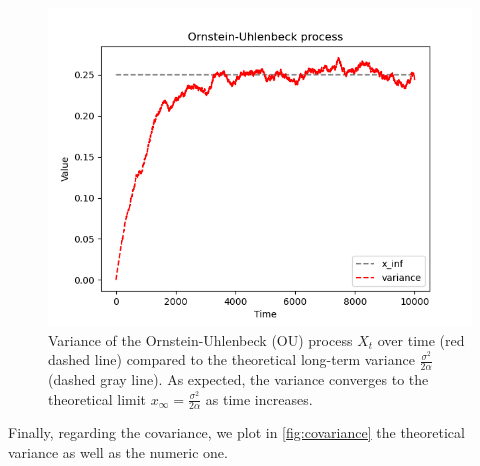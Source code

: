 \documentclass[a4paper,12pt]{article} %
\begin{document}
\begin{figure}[h!]
    \centering
    \includegraphics[width=1\textwidth]{plots/variance.png} %
    \caption{Variance of the Ornstein-Uhlenbeck (OU) process \( X_t \) over time (red dashed line) compared to the theoretical long-term variance \( \frac{\sigma^2}{2\alpha} \) (dashed gray line). As expected, the variance converges to the theoretical limit \( x_{\infty} = \frac{\sigma^2}{2\alpha} \) as time increases.}

    \label{fig:var}
\end{figure}

Finally, regarding the covariance, we plot in \ref{fig:covariance} the theoretical variance as well as the numeric one.
\end{document}
